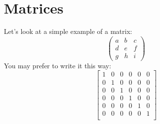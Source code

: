 \section{Matrices}
Let's look at a simple example of a matrix:
\[ \left( \begin{array}{ccc}
a & b & c \\
d & e & f \\
g & h & i \end{array} \right)\] 
%
You may prefer to write it this way:
\[ \left[\begin{array} {cccccc}
1 & 0 & 0 & 0 & 0 & 0 \\
0 & 1 & 0 & 0 & 0 & 0 \\
0 & 0 & 1 & 0 & 0 & 0 \\
0 & 0 & 0 & 1 & 0 & 0 \\
0 & 0 & 0 & 0 & 1 & 0 \\
0 & 0 & 0 & 0 & 0 & 1 \\
\end{array} \right] \]
